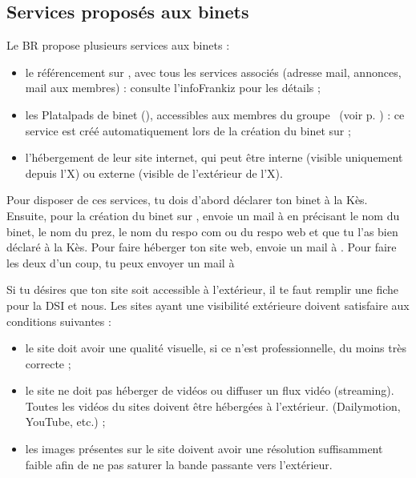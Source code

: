 \subsection{Services proposés aux binets}

Le BR propose plusieurs services aux binets :
\begin{itemize}
\item le référencement sur \fkz, avec tous les services associés (adresse mail, annonces, mail aux membres) : consulte l'infoFrankiz pour les détails ;
\item les Platalpads de binet (), accessibles aux membres du groupe \fkz\ (voir p. \pageref{platalpad}) : ce service est créé automatiquement lors de la création du binet sur \fkz ;
\item l'hébergement de leur site internet, qui peut être interne (visible uniquement depuis l'X) ou externe (visible de l'extérieur de l'X).\\
\end{itemize}

Pour disposer de ces services, tu dois d'abord déclarer ton binet à la Kès. Ensuite, pour la création du binet sur \fkz, envoie un mail à  en précisant le nom du binet, le nom du prez, le nom du respo com ou du respo web et que tu l'as bien déclaré à la Kès. Pour faire héberger ton site web, envoie un mail à . Pour faire les deux d'un coup, tu peux envoyer un mail à 

\vspace{4mm}

Si tu désires que ton site soit accessible à l'extérieur, il te faut remplir une fiche pour la DSI et nous. Les sites ayant une visibilité extérieure doivent satisfaire aux conditions suivantes :
\begin{itemize}
    \item le site doit avoir une qualité visuelle, si ce n'est professionnelle, du moins très correcte ;
    \item le site ne doit pas héberger de vidéos ou diffuser un flux vidéo (streaming). Toutes les vidéos du sites doivent être hébergées à l'extérieur. (Dailymotion, YouTube, etc.) ;
    \item les images présentes sur le site doivent avoir une résolution suffisamment faible afin de ne pas saturer la bande passante vers l'extérieur. 
\end{itemize}

